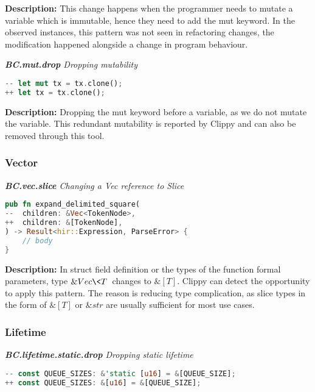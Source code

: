 \noindent \textbf{Description:} This change happens when the programmer needs to mutate a variable which is immutable, hence they need to add the mut keyword. In the observed instances, this pattern was not seen in refactoring changes, the modification happened alongside a change in program behaviour.

\noindent \textit{ \textbf{BC.mut.drop} Dropping mutability}

\begin{lstlisting}[language=Rust, style=colouredRust, label={l3}]
-- let mut tx = tx.clone();
++ let tx = tx.clone();
\end{lstlisting}

\noindent \textbf{Description:} Dropping the mut keyword before a variable, as we do not mutate the variable. This redundant mutability is reported by Clippy and can also be removed through this tool.

\subsubsection{Vector}

\noindent \textit{ \textbf{BC.vec.slice} Changing a Vec reference to Slice}

\begin{lstlisting}[language=Rust, style=colouredRust, label={l3}]
pub fn expand_delimited_square(
--  children: &Vec<TokenNode>,
++  children: &[TokenNode],
) -> Result<hir::Expression, ParseError> {
    // body
}
\end{lstlisting}
\noindent \textbf{Description:} In struct field definition or the types of the function formal parameters, type $\&Vec\<T\>$ changes to $\&[T]$. Clippy can detect the opportunity to apply this pattern. The reason is reducing type complication, as slice types in the form of $\&[T]$ or $\&str$ are usually sufficient for most use cases. 

\subsubsection{Lifetime}
\noindent \textit{ \textbf{BC.lifetime.static.drop} Dropping static lifetime}

\begin{lstlisting}[language=Rust, style=colouredRust, label={l3}]
-- const QUEUE_SIZES: &'static [u16] = &[QUEUE_SIZE];
++ const QUEUE_SIZES: &[u16] = &[QUEUE_SIZE];

\end{lstlisting}

